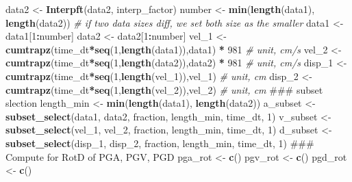 \documentclass[]{article}
\newenvironment{Shaded}{\begin{snugshade}}{\end{snugshade}}
\newcommand{\KeywordTok}[1]{\textcolor[rgb]{0.13,0.29,0.53}{\textbf{#1}}}
\newcommand{\DecValTok}[1]{\textcolor[rgb]{0.00,0.00,0.81}{#1}}
\newcommand{\StringTok}[1]{\textcolor[rgb]{0.31,0.60,0.02}{#1}}
\newcommand{\CommentTok}[1]{\textcolor[rgb]{0.56,0.35,0.01}{\textit{#1}}}
\newcommand{\OperatorTok}[1]{\textcolor[rgb]{0.81,0.36,0.00}{\textbf{#1}}}
\newcommand{\NormalTok}[1]{#1}
\begin{document}
\begin{Shaded}
\begin{Highlighting}[]
{\NormalTok{  data2 <-}\StringTok{ }\KeywordTok{Interpft}\NormalTok{(data2, interp_factor)}
\NormalTok{  number <-}\StringTok{ }\KeywordTok{min}\NormalTok{(}\KeywordTok{length}\NormalTok{(data1), }\KeywordTok{length}\NormalTok{(data2)) }\CommentTok{# if two data sizes diff, we set both size as the smaller}
\NormalTok{  data1 <-}\StringTok{ }\NormalTok{data1[}\DecValTok{1}\OperatorTok{:}\NormalTok{number]}
\NormalTok{  data2 <-}\StringTok{ }\NormalTok{data2[}\DecValTok{1}\OperatorTok{:}\NormalTok{number]}
\NormalTok{  vel_}\DecValTok{1}\NormalTok{ <-}\StringTok{ }\KeywordTok{cumtrapz}\NormalTok{(time_dt}\OperatorTok{*}\KeywordTok{seq}\NormalTok{(}\DecValTok{1}\NormalTok{,}\KeywordTok{length}\NormalTok{(data1)),data1) }\OperatorTok{*}\StringTok{ }\DecValTok{981} \CommentTok{# unit, cm/s}
\NormalTok{  vel_}\DecValTok{2}\NormalTok{ <-}\StringTok{ }\KeywordTok{cumtrapz}\NormalTok{(time_dt}\OperatorTok{*}\KeywordTok{seq}\NormalTok{(}\DecValTok{1}\NormalTok{,}\KeywordTok{length}\NormalTok{(data2)),data2) }\OperatorTok{*}\StringTok{ }\DecValTok{981} \CommentTok{# unit, cm/s}
\NormalTok{  disp_}\DecValTok{1}\NormalTok{ <-}\StringTok{ }\KeywordTok{cumtrapz}\NormalTok{(time_dt}\OperatorTok{*}\KeywordTok{seq}\NormalTok{(}\DecValTok{1}\NormalTok{,}\KeywordTok{length}\NormalTok{(vel_}\DecValTok{1}\NormalTok{)),vel_}\DecValTok{1}\NormalTok{) }\CommentTok{# unit, cm}
\NormalTok{  disp_}\DecValTok{2}\NormalTok{ <-}\StringTok{ }\KeywordTok{cumtrapz}\NormalTok{(time_dt}\OperatorTok{*}\KeywordTok{seq}\NormalTok{(}\DecValTok{1}\NormalTok{,}\KeywordTok{length}\NormalTok{(vel_}\DecValTok{2}\NormalTok{)),vel_}\DecValTok{2}\NormalTok{) }\CommentTok{# unit, cm}
\NormalTok{  ### subset slection}
\NormalTok{  length_min <-}\StringTok{ }\KeywordTok{min}\NormalTok{(}\KeywordTok{length}\NormalTok{(data1), }\KeywordTok{length}\NormalTok{(data2))}
\NormalTok{  a_subset <-}\StringTok{ }\KeywordTok{subset_select}\NormalTok{(data1, data2, fraction, length_min, time_dt, }\DecValTok{1}\NormalTok{)}
\NormalTok{  v_subset <-}\StringTok{ }\KeywordTok{subset_select}\NormalTok{(vel_}\DecValTok{1}\NormalTok{, vel_}\DecValTok{2}\NormalTok{, fraction, length_min, time_dt, }\DecValTok{1}\NormalTok{)}
\NormalTok{  d_subset <-}\StringTok{ }\KeywordTok{subset_select}\NormalTok{(disp_}\DecValTok{1}\NormalTok{, disp_}\DecValTok{2}\NormalTok{, fraction, length_min, time_dt, }\DecValTok{1}\NormalTok{)}
\NormalTok{  ### Compute for RotD of PGA, PGV, PGD}
\NormalTok{  pga_rot <-}\StringTok{ }\KeywordTok{c}\NormalTok{()}
\NormalTok{  pgv_rot <-}\StringTok{ }\KeywordTok{c}\NormalTok{()}
\NormalTok{  pgd_rot <-}\StringTok{ }\KeywordTok{c}\NormalTok{()}
}
\end{Highlighting}
\end{Shaded}
\end{document}

